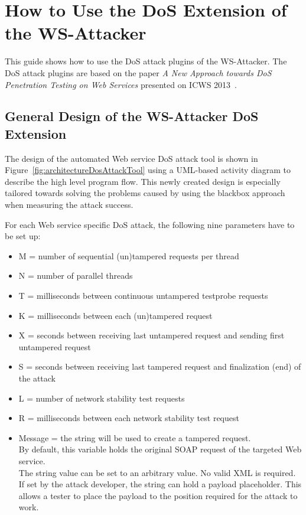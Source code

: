 \section[DoS Extension]{How to Use the DoS Extension of the WS-Attacker}
\label{sec:how_to_use_dos_extension}

This guide shows how to use the DoS attack plugins of the WS-Attacker.
The DoS attack plugins are based on the paper \emph{A New Approach towards DoS Penetration Testing on Web Services} presented on ICWS 2013~\cite{wsattackerDoS}.

\subsection{General Design of the WS-Attacker DoS Extension}
\label{sec:design_DoS_extension}

The design of the automated Web service DoS attack tool is shown in Figure~\ref{fig:architectureDosAttackTool} using a UML-based activity diagram to describe the high level program flow.
This newly created design is especially tailored towards solving the problems caused by using the blackbox approach when measuring the attack success.\newline

For each Web service specific DoS attack, the following nine parameters have to be set up:
\begin{itemize}
  \item M = number of sequential (un)tampered requests per thread 
  \item N = number of parallel threads 
  \item T = milliseconds between continuous untampered testprobe requests
  \item K = milliseconds between each (un)tampered request 
  \item X = seconds between receiving last untampered request and sending first untampered request 
  \item S = seconds between receiving last tampered request and finalization (end) of the attack 
  \item L = number of network stability test requests
  \item R = milliseconds between each network stability test request 
  \item Message = the string will be used to create a tampered request.\\
  By default, this variable holds the original SOAP request of the targeted Web service.\\
  The string value can be set to an arbitrary value. No valid XML is required.\\
  If set by the attack developer, the string can hold a payload placeholder. This allows a tester to place the payload to the position required for the attack to work.
\end{itemize}


